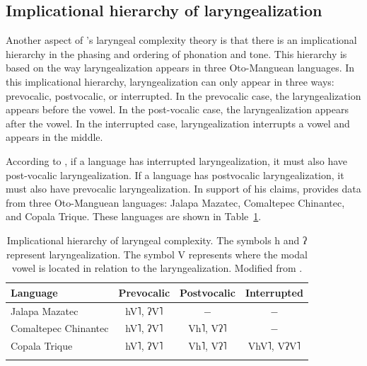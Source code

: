 \subsection{Implicational hierarchy of laryngealization}\label{sec:implicational_hierarchy}

Another aspect of \citeauthor{silvermanLaryngealComplexityOtomanguean1997}'s \citeyear{silvermanLaryngealComplexityOtomanguean1997} laryngeal complexity theory is that there is an implicational hierarchy in the phasing and ordering of phonation and tone. This hierarchy is based on the way laryngealization appears in three Oto-Manguean languages. In this implicational hierarchy, laryngealization can only appear in three ways: prevocalic, postvocalic, or interrupted. In the prevocalic case, the laryngealization appears before the vowel. In the post-vocalic case, the laryngealization appears after the vowel. In the interrupted case, laryngealization interrupts a vowel and appears in the middle.

According to \citet{silvermanLaryngealComplexityOtomanguean1997}, if a language has interrupted laryngealization, it must also have post-vocalic laryngealization. If a language has postvocalic laryngealization, it must also have prevocalic laryngealization. In support of his claims, \citet{silvermanLaryngealComplexityOtomanguean1997} provides data from three Oto-Manguean languages: Jalapa Mazatec, Comaltepec Chinantec, and Copala Trique. These languages are shown in Table~\ref{tab:implicational_hierarchy}.

\begin{table}[h!]
    \centering
    \caption{Implicational hierarchy of laryngeal complexity. The symbols h and ʔ represent laryngealization. The symbol V represents where the modal vowel is located in relation to the laryngealization.  Modified from \citet{silvermanLaryngealComplexityOtomanguean1997}.} 
    \label{tab:implicational_hierarchy}
    \begin{tabular}{lccc}
        \lsptoprule
        \textbf{Language} & \textbf{Prevocalic} & \textbf{Postvocalic} & \textbf{Interrupted} \\
        \hline 
        Jalapa Mazatec & hV˥, ʔV˥ & $-$ & $-$ \\
        Comaltepec Chinantec & hV˥, ʔV˥ & Vh˥, Vʔ˥ & $-$ \\
        Copala Trique & hV˥, ʔV˥ & Vh˥, Vʔ˥ & VhV˥, VʔV˥ \\
        \lspbottomrule
    \end{tabular}
\end{table}

